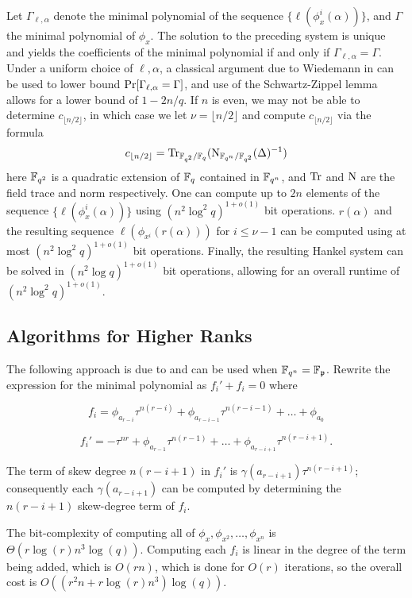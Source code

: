 Let $\Gamma_{\ell, \alpha}$ denote the minimal polynomial of the sequence $\{ \ell (\phi_x^i(\alpha))\}$, and $\Gamma$ the minimal polynomial of $\phi_x$. The solution to the preceding system is unique and yields the coefficients of the minimal polynomial if and only if $\Gamma_{\ell, \alpha} = \Gamma$. Under a uniform choice of $\ell, \alpha$, a classical argument due to Wiedemann in \cite{Wiedemann:1986:SSL:13738.13744} can be used to lower bound $\textnormal{Pr}[\Gamma_{\ell, \alpha} = \Gamma]$, and use of the Schwartz-Zippel lemma allows for a lower bound of $1-2n/q$. If $n$ is even, we may not be able to determine $c_{\lfloor n/2 \rfloor}$, in which case we let $\nu = \lfloor n/2 \rfloor$ and compute $c_{\lfloor n/2 \rfloor}$ via the formula
\begin{equation*}
    c_{\lfloor n/2 \rfloor} = \textnormal{Tr}_{\F_{q^2}/\F_{q}}(\textnormal{N}_{\L/\F_{q^2}}(\Delta)^{-1})%
\end{equation*}
here $\mathbb{F}_{q^2}$ is a quadratic extension of $\mathbb{F}_q$ contained in $\mathbb{F}_{q^n}$, and $\textnormal{Tr}$ and $\textnormal{N}$ are the field trace and norm respectively. One can compute up to $2n$ elements of the sequence $\{ \ell (\phi_x^i(\alpha))\}$ using $(n^2 \log^2q)^{1 + o(1)}$ bit operations. $r(\alpha)$ and the resulting sequence $\ell(\phi_{x^i}(r(\alpha)))$ for $i \leq \nu -1$ can be computed using at most $(n^2 \log^2q)^{1 + o(1)}$ bit operations. Finally, the resulting Hankel system can be solved in $(n^2 \log q)^{1 + o(1)}$ bit operations, allowing for an overall runtime of $(n^2 \log^2q)^{1 + o(1)}$. 

\subsection{Algorithms for Higher Ranks}


The following approach is due to \cite{GaraiPapikian} and can be used when $\mathbb{F}_{q^n} = \mathbb{F}_{\frak{p}}$. Rewrite the expression for the minimal polynomial as $f_i' + f_i = 0$ where

\[ f_i = \phi_{a_{r-i}}\tau^{n (r-i)} + \phi_{a_{r - i -1 }}\tau^{n (r-i-1)} + \ldots + \phi_{a_0} \]

\[ f_i' = -\tau^{nr} + \phi_{a_{r -1 }}\tau^{n (r-1)} + \ldots + \phi_{a_{r-i + 1}}\tau^{n(r - i + 1)}. \]

The term of skew degree $n(r - i + 1)$ in $f_i'$ is  $\gamma(a_{r-i+1}) \tau^{n(r-i + 1)}$; consequently each $\gamma(a_{r-i+1})$ can be computed by determining the $n(r - i + 1)$ skew-degree term of $f_i$.

The bit-complexity of computing all of $\phi_x, \phi_{x^2}, \ldots, \phi_{x^n}$ is \newline
$\Theta(r\log(r)n^3\log(q))$. Computing each $f_i$ is linear in the degree of the term being added, which is $O(rn)$, which is done for $O(r)$ iterations, so the overall cost is $O((r^2n + r\log(r)n^3)\log(q) )$.